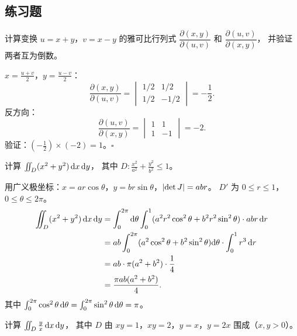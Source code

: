 \documentclass{ctexart}
\begin{document}
\subsection{练习题}

\begin{exercise}[基本雅可比计算]
  计算变换 $u = x+y$，$v = x-y$ 的雅可比行列式
  $\dfrac{\partial(x,y)}{\partial(u,v)}$ 和 $\dfrac{\partial(u,v)}{\partial(x,y)}$，
  并验证两者互为倒数。
\end{exercise}

\begin{solution}
  $x = \frac{u+v}{2}$，$y = \frac{u-v}{2}$：
  \[
    \frac{\partial(x,y)}{\partial(u,v)}
    = \begin{vmatrix} 1/2 & 1/2 \\ 1/2 & -1/2 \end{vmatrix}
    = -\frac{1}{2}.
  \]
  反方向：
  \[
    \frac{\partial(u,v)}{\partial(x,y)}
    = \begin{vmatrix} 1 & 1 \\ 1 & -1 \end{vmatrix}
    = -2.
  \]
  验证：$(-\frac{1}{2}) \times (-2) = 1$。$\square$
\end{solution}

\begin{exercise}
  计算 $\iint_D (x^2+y^2) \,\mathrm{d} x\,\mathrm{d} y$，
  其中 $D: \frac{x^2}{a^2}+\frac{y^2}{b^2} \le 1$。
\end{exercise}

\begin{solution}
  用广义极坐标：$x = ar\cos\theta$，$y = br\sin\theta$，$\left| \det J \right| = abr$。
  $D'$ 为 $0 \le r \le 1$，$0 \le \theta \le 2\pi$。
  \begin{align*}
    \iint_D (x^2+y^2) \,\mathrm{d} x\,\mathrm{d} y
    &= \int_0^{2\pi} \mathrm{d} \theta \int_0^1 (a^2r^2\cos^2\theta + b^2r^2\sin^2\theta) \cdot abr \,\mathrm{d} r \\
    &= ab \int_0^{2\pi} (a^2\cos^2\theta + b^2\sin^2\theta) \mathrm{d} \theta \cdot \int_0^1 r^3 \,\mathrm{d} r \\
    &= ab \cdot \pi(a^2 + b^2) \cdot \frac{1}{4} \\
    &= \frac{\pi ab(a^2+b^2)}{4}.
  \end{align*}
  其中 $\int_0^{2\pi} \cos^2\theta \,\mathrm{d} \theta = \int_0^{2\pi} \sin^2\theta \,\mathrm{d} \theta = \pi$。
\end{solution}

\begin{exercise}[换元化简被积函数]
  计算 $\iint_D \frac{y}{x} \,\mathrm{d} x\,\mathrm{d} y$，
  其中 $D$ 由 $xy = 1$，$xy = 2$，$y = x$，$y = 2x$ 围成（$x, y > 0$）。
\end{exercise}
\end{document}
